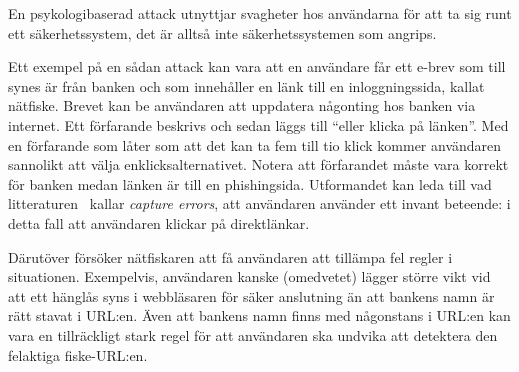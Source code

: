 \documentclass[svv,addpoints]{miunexam}
\begin{document}
\begin{questions}
\begin{parts}
    \begin{solution}
      En psykologibaserad attack utnyttjar svagheter hos användarna för att ta 
      sig runt ett säkerhetssystem, det är alltså inte säkerhetssystemen som 
      angrips.

      Ett exempel på en sådan attack kan vara att en användare får ett e-brev 
      som till synes är från banken och som innehåller en länk till en 
      inloggningssida, kallat nätfiske.
      Brevet kan be användaren att uppdatera någonting hos banken via internet.
      Ett förfarande beskrivs och sedan läggs till \enquote{eller klicka på 
        länken}.
      Med en förfarande som låter som att det kan ta fem till tio klick kommer 
      användaren sannolikt att välja enklicksalternativet.
      Notera att förfarandet måste vara korrekt för banken medan länken är till 
      en phishingsida.
      Utformandet kan leda till vad litteraturen~\cite[s. 23]{Anderson2008sea} 
      kallar \emph{\foreignlanguage{english}{capture errors}}, att användaren 
      använder ett invant beteende: i detta fall att användaren klickar på 
      direktlänkar.

      Därutöver försöker nätfiskaren att få användaren att tillämpa fel regler 
      i situationen.
      Exempelvis, användaren kanske (omedvetet) lägger större vikt vid att ett 
      hänglås syns i webbläsaren för säker anslutning än att bankens namn är 
      rätt stavat i URL:en.
      Även att bankens namn finns med någonstans i URL:en kan vara en 
      tillräckligt stark regel för att användaren ska undvika att detektera den 
      felaktiga fiske-URL:en.
    \end{solution}
  \end{parts}


  
\end{questions}


\printbibliography{}
\end{document}
